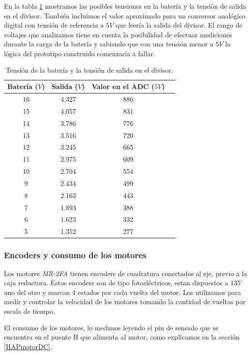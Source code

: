 En la tabla \ref{HTdivT} mostramos las posibles tensiones en la bater\'ia y la tensi\'on de salida en el divisor. Tambi\'en incluimos el
valor aproximado para un conversor anal\'ogico digital con tensi\'on de referencia a $5V$ que leer\'ia la salida del divisor. El rango de
voltajes que analizamos tiene en cuenta la posibilidad de efectuar mediciones durante la carga de la bater\'ia y sabiendo que con una
tensi\'on menor a $5 V$ la l\'ogica del prototipo construido comenzar\'ia a fallar.

\begin{table}[ht]
	\begin{center}
		\begin{tabular}{|c|c|c|c|}
			\hline
			Bater\'ia ($V$) & Salida ($V$) & Valor en el ADC ($5V$) \\
			\hline
			16 & 4.327 & 886 \\
			15 & 4.057 & 831 \\
			14 & 3.786 & 776 \\
			13 & 3.516 & 720 \\
			12 & 3.245 & 665 \\
			11 & 2.975 & 609 \\
			10 & 2.704 & 554 \\
			 9 & 2.434 & 499 \\
			 8 & 2.163 & 443 \\
			 7 & 1.893 & 388 \\
			 6 & 1.623 & 332 \\
			 5 & 1.352 & 277 \\
			\hline
		\end{tabular}
	\end{center}
	\caption{Tensi\'on de la bater\'ia y la tensi\'on de salida en el divisor.}
	\label{HTdivT}
\end{table}

\subsubsection{Encoders y consumo de los motores}
\label{HSencodersConsumo}

Los motores \emph{MR-2FA} tienen encoders de cuadratura conectados al eje, previo a la caja reductora. Estos encoders son
de tipo fotoel\'ectricos, estan dispuestos a $135^{\circ}$ uno del otro y marcan $4$ estados por cada vuelta del motor.
Los utilizamos para medir y controlar la velocidad de los motores tomando la cantidad de vueltas por escala de tiempo.

El consumo de los motores, lo medimos leyendo el pin de sensado que se encuentra en el puente H que alimenta al motor, como
explicamos en la secci\'on \ref{HAPmotorDC}.

